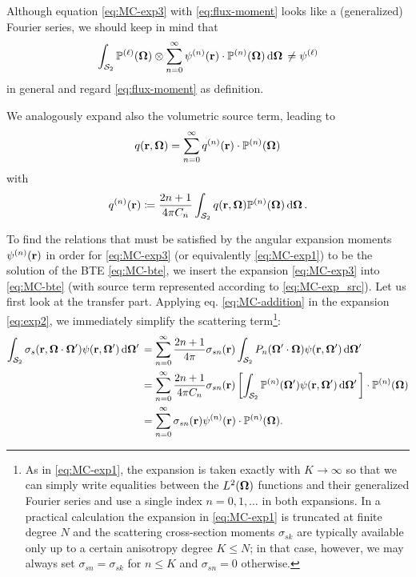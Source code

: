 Although equation \eqref{eq:MC-exp3} with \eqref{eq:flux-moment} looks like a (generalized) Fourier series, we should 
keep in mind that
$$
  \intA{\PP[\ell](\bomega)\otimes\suma[n]{0}{\infty}\fmom(\br)\contr\PP(\bomega)} \neq \fmom[\ell]
$$
in general and regard \eqref{eq:flux-moment} as definition.

We analogously expand also the volumetric source term, leading to 
\begin{equation}\label{eq:MC-exp_src}
  q(\br,\bomega) = \suma[n]{0}{\infty}\qmom(\br)\contr\PP(\bomega)
\end{equation}
with
\begin{equation*}
  \qmom(\br) \coloneqq \frac{2n+1}{4\pi C_n}\intA{q(\br,\bomega)\PP(\bomega)}.
\end{equation*}

To find the relations that must be satisfied by the angular expansion moments $\fmom(\br)$ in order for
\eqref{eq:MC-exp3} (or equivalently \eqref{eq:MC-exp1}) to be the solution of the BTE \eqref{eq:MC-bte}, we insert the
expansion \eqref{eq:MC-exp3} into \eqref{eq:MC-bte} (with source term represented according to \eqref{eq:MC-exp_src}).
Let us first look at the transfer part.
Applying eq. \eqref{eq:MC-addition} in the expansion \eqref{eq:exp2}, we immediately simplify the scattering
term\footnote{As in \eqref{eq:MC-exp1}, the expansion is taken exactly with $K\to\infty$ so that we can simply write
equalities between the $\Lp[2](\bomega)$ functions and their generalized Fourier series and use a single index $n =
0,1,\ldots$ in both expansions. In a practical calculation the expansion in \eqref{eq:MC-exp1} is truncated at finite
degree $N$ and the scattering cross-section moments $\sigma_{sk}$ are typically available only up to a certain
anisotropy degree $K \leq N$; in that case, however, we may always set $\sigma_{sn} = \sigma_{sk}$ for $n \leq K$ and
$\sigma_{sn} = 0$ otherwise.}:
\begin{equation*}%
  \begin{aligned}
  \intA[']{\sigma_s(\br,\bomega\cdot\bomega')\psi(\br,\bomega')} &= 
    \suma[n]{0}{\infty}
    \frac{2n+1}{4\pi}\sigma_{sn}(\br)\intA[']{P_n(\bomega'\cdot\bomega)\psi(\br,\bomega')}\\
    & = \suma[n]{0}{\infty}
    \frac{2n+1}{4\pi C_n}\sigma_{sn}(\br)\left[\intA[']{\PP(\bomega')\psi(\br,\bomega')}\right]\contr\PP(\bomega)\\
    & = \suma[n]{0}{\infty}
    \sigma_{sn}(\br)\fmom(\br)\contr\PP(\bomega).
    \end{aligned}
\end{equation*}
